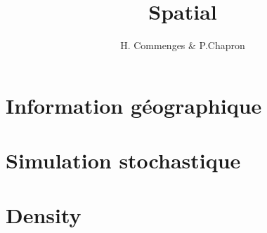 \documentclass{beamer}
\author{H. Commenges & P.Chapron}
\title{Spatial}
\date{}
\begin{document}
\section{Information géographique}

  
  
  
  
\section{Simulation stochastique}

  
  
\section{Density}

 






  
\end{document}
